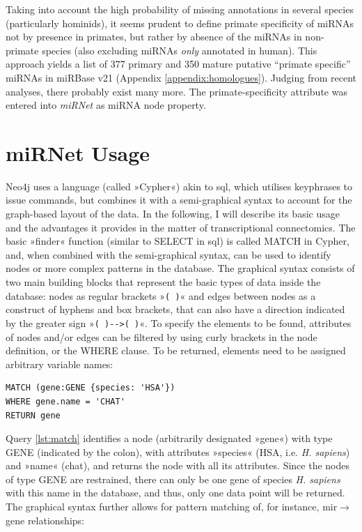 Taking into account the high probability of missing annotations in several species (particularly hominids), it seems prudent to define primate specificity of miRNAs not by presence in primates, but rather by absence of the miRNAs in non-primate species (also excluding miRNAs \emph{only} annotated in human). This approach yields a list of 377 primary and 350 mature putative “primate specific” miRNAs in miRBase v21 (Appendix \ref{appendix:homologues}). Judging from recent analyses\cite{Londin2015}, there probably exist many more. The primate-specificity attribute was entered into \emph{miRNet} as miRNA node property.

\section{miRNet Usage}
Neo4j uses a language (called »Cypher«) akin to \ac{sql}, which utilises keyphrases to issue commands, but combines it with a semi-graphical syntax to account for the graph-based layout of the data. In the following, I will describe its basic usage and the advantages it provides in the matter of transcriptional connectomics. The basic »finder« function (similar to \textcolor{dkblue}{SELECT} in \ac{sql}) is called \textcolor{dkblue}{MATCH} in Cypher, and, when combined with the semi-graphical syntax, can be used to identify nodes or more complex patterns in the database. The graphical syntax consists of two main building blocks that represent the basic types of data inside the database: nodes as regular brackets »\texttt{( )}« and edges between nodes as  a construct of hyphens and box brackets, that can also have a direction indicated by the greater sign \mbox{»\texttt{( )-\string[ \string]->( )}«}. To specify the elements to be found, attributes of nodes and/or edges can be filtered by using curly brackets in the node definition, or the \textcolor{dkblue}{WHERE} clause. To be returned, elements need to be assigned arbitrary variable names:

\begin{lstlisting}[label=lst:match, caption=MATCH, language=Cypher]
MATCH (gene:GENE {species: 'HSA'})
WHERE gene.name = 'CHAT'
RETURN gene
\end{lstlisting}

Query \ref{lst:match} identifies a node (arbitrarily designated »gene«) with type GENE (indicated by the colon), with attributes »species« (HSA, i.e. \textit{H. sapiens}) and »name« (\ac{chat}), and returns the node with all its attributes. Since the nodes of type GENE are restrained, there can only be one gene of species \textit{H. sapiens} with this name in the database, and thus, only one data point will be returned. The graphical syntax further allows for pattern matching of, for instance, \ac{mir}$\to$gene relationships:

